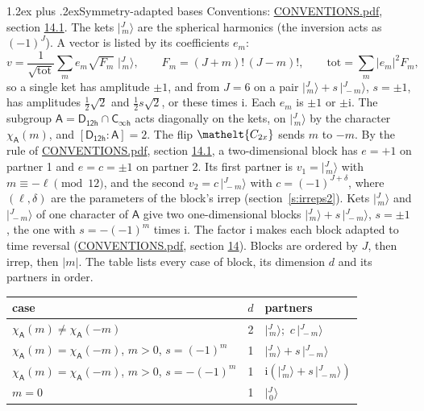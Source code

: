 \documentclass[10pt,a4paper]{article}
\makeatletter
\renewcommand\section{\@startsection{section}{1}{\z@}{-3ex plus -1ex minus -.2ex}%
  {1.2ex plus .2ex}{\normalfont\large\sffamily\bfseries\color{parttitle}}}
\numberwithin{equation}{section}
\newcommand{\eltfont}[1]{{\let\sigma\eltsigma\mathelt{#1}}}
\newcommand{\grp}[1]{\mathsf{#1}}
\newcommand{\elt}[1]{\eltfont{#1}}
\newcommand{\grpindex}[2]{[#1 : #2]}
\newcommand{\iunit}{\mathrm{i}}
\newcommand{\chiA}{\chi_{\grp{A}}}
\newcommand{\jm}[2]{\bigl\lvert{}^{#1}_{\,#2}\bigr\rangle}
\makeatother
\begin{document}
\section{Symmetry-adapted bases}\label{s:bases}
Conventions: \href{../../CONVENTIONS.pdf}{CONVENTIONS.pdf}, section \href{../../CONVENTIONS.pdf\#conv.14.1}{14.1}.
\leavevmode\label{n:index.m}\label{n:vector.ket}The kets $\jm{J}{m}$ are the spherical harmonics (the inversion acts as $(-1)^J$). \label{n:index.ketcoefficient}\label{n:vector.basis.symmetry}\label{n:index.ketweight}\label{n:index.total}A vector is listed by its coefficients $e_m$:
\begin{equation}\label{e:ket}v = \frac{1}{\sqrt{\mathrm{tot}}}\sum_m e_m\sqrt{F_m}\;\jm{J}{m},\qquad F_m = (J+m)!\,(J-m)!,\qquad \mathrm{tot} = \sum_m |e_m|^2F_m,\end{equation}
\leavevmode\label{n:index.pair.sign}so a single ket has amplitude $\pm1$, and from $J = 6$ on a pair $\jm{J}{m} + s\,\jm{J}{-m}$, $s = \pm1$, has amplitudes $\tfrac{1}{2}\sqrt{2}$ and $\tfrac{1}{2}s\sqrt{2}$, or these times $\iunit$. Each $e_m$ is $\pm1$ or $\pm\iunit$.
\leavevmode\label{n:group.A}\label{n:function.character.abelian}The subgroup $\grp{A} = \grp{D_{12h}}\cap\grp{C_{\infty h}}$ acts diagonally on the kets, on $\jm{J}{m}$ by the character $\chiA(m)$, and $\grpindex{\grp{D_{12h}}}{\grp{A}} = 2$. The flip $\elt{C_{2x}}$ sends $m$ to $-m$. \label{n:index.partner.sign}By the rule of \href{../../CONVENTIONS.pdf}{CONVENTIONS.pdf}, section \href{../../CONVENTIONS.pdf\#conv.14.1}{14.1}, a two-dimensional block has $e = +1$ on partner 1 and $e = c = \pm1$ on partner 2. Its first partner is $v_1 = \jm{J}{m}$ with $m \equiv -\ell \pmod{12}$, and the second $v_2 = c\,\jm{J}{-m}$ with $c = (-1)^{J+\delta}$, where $(\ell, \delta)$ are the parameters of the block's irrep (section~\ref{s:irreps2}). Kets $\jm{J}{m}$ and $\jm{J}{-m}$ of one character of $\grp{A}$ give two one-dimensional blocks $\jm{J}{m} + s\,\jm{J}{-m}$, $s = \pm1$, the one with $s = -(-1)^m$ times $\iunit$. The factor $\iunit$ makes each block adapted to time reversal (\href{../../CONVENTIONS.pdf}{CONVENTIONS.pdf}, section \href{../../CONVENTIONS.pdf\#conv.14}{14}). Blocks are ordered by $J$, then irrep, then $|m|$.
\leavevmode\label{n:head.case}\label{n:head.partners}The table lists every case of block, its dimension $d$ and its partners in order.
\begin{center}\begin{tabular}{@{}lrl@{}}\toprule
case & $d$ & partners\\\midrule
$\chiA(m) \ne \chiA(-m)$ & 2 & $\jm{J}{m}$;\ $c\,\jm{J}{-m}$\\
$\chiA(m) = \chiA(-m)$, $m > 0$, $s = (-1)^m$ & 1 & $\jm{J}{m} + s\,\jm{J}{-m}$\\
$\chiA(m) = \chiA(-m)$, $m > 0$, $s = -(-1)^m$ & 1 & $\iunit(\jm{J}{m} + s\,\jm{J}{-m})$\\
$m = 0$ & 1 & $\jm{J}{0}$\\
\bottomrule\end{tabular}\end{center}
\end{document}
